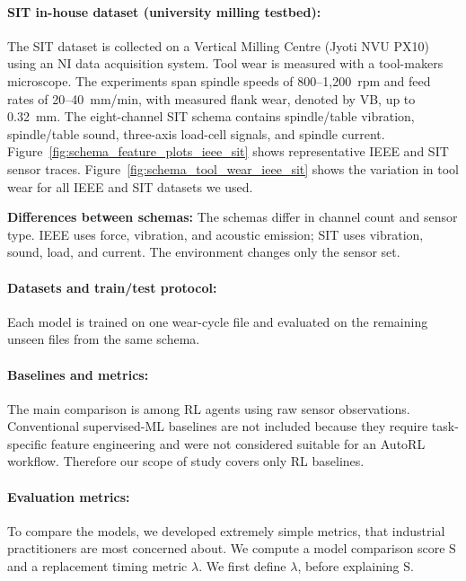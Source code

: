 \documentclass[sn-basic]{sn-jnl}%
\begin{document}
\paragraph{SIT in-house dataset (university milling testbed):}
The SIT dataset is collected on a Vertical Milling Centre (Jyoti NVU PX10) using an NI data acquisition system. Tool wear is measured with a tool-makers microscope. The experiments span spindle speeds of 800--1{,}200~rpm and feed rates of 20--40~mm/min, with measured flank wear, denoted by \textsc{\textsc{VB}},  up to 0.32~mm. The eight-channel SIT schema contains spindle/table vibration, spindle/table sound, three-axis load-cell signals, and spindle current. Figure~\ref{fig:schema_feature_plots_ieee_sit} shows representative IEEE and SIT sensor traces. Figure~\ref{fig:schema_tool_wear_ieee_sit} shows the variation in tool wear for all IEEE and SIT datasets we used.

\textbf{Differences between schemas:}
The schemas differ in channel count and sensor type. IEEE uses force, vibration, and acoustic emission; SIT uses vibration, sound, load, and current. The environment changes only the sensor set.

\paragraph{Datasets and train/test protocol:}
Each model is trained on one wear-cycle file and evaluated on the remaining unseen files from the same schema. 

\paragraph{Baselines and metrics:}
\label{sec:metrics}
The main comparison is among RL agents using raw sensor observations. Conventional supervised-ML baselines are not included because they require task-specific feature engineering and were not considered suitable for an AutoRL workflow. Therefore our scope of study covers only RL baselines.

\paragraph{Evaluation metrics:}
To compare the models, we developed extremely simple metrics, that industrial practitioners are most concerned about. We compute a model comparison score $\mathrm{S}$ and a replacement timing metric $\lambda$. We first define $\lambda$, before explaining $\mathrm{S}$.
\end{document}
